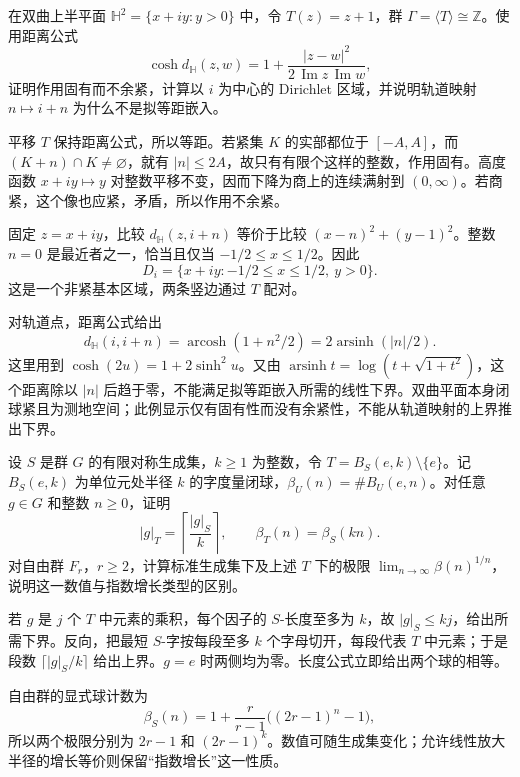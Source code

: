 \begin{exercise}\label{g3:ex:D-parabolic-orbit}
	在双曲上半平面 \(\mathbb H^2=\{x+iy:y>0\}\) 中，令 \(T(z)=z+1\)，群 \(\Gamma=\langle T\rangle\cong\mathbb Z\)。使用距离公式
	\[
		\cosh d_{\mathbb H}(z,w)
		=1+\frac{|z-w|^2}{2\,\operatorname{Im}z\,\operatorname{Im}w},
	\]
	证明作用固有而不余紧，计算以 \(i\) 为中心的 Dirichlet 区域，并说明轨道映射 \(n\mapsto i+n\) 为什么不是拟等距嵌入。
\end{exercise}
\begin{solution}
	平移 \(T\) 保持距离公式，所以等距。若紧集 \(K\) 的实部都位于 \([-A,A]\)，而 \((K+n)\cap K\ne\varnothing\)，就有 \(|n|\le2A\)，故只有有限个这样的整数，作用固有。高度函数 \(x+iy\mapsto y\) 对整数平移不变，因而下降为商上的连续满射到 \((0,\infty)\)。若商紧，这个像也应紧，矛盾，所以作用不余紧。

	固定 \(z=x+iy\)，比较 \(d_{\mathbb H}(z,i+n)\) 等价于比较
	\((x-n)^2+(y-1)^2\)。整数 \(n=0\) 是最近者之一，恰当且仅当 \(-1/2\le x\le1/2\)。因此
	\[
		D_i=\{x+iy:-1/2\le x\le1/2,\ y>0\}.
	\]
	这是一个非紧基本区域，两条竖边通过 \(T\) 配对。

	对轨道点，距离公式给出
	\[
		d_{\mathbb H}(i,i+n)
		=\operatorname{arcosh}(1+n^2/2)
		=2\operatorname{arsinh}(|n|/2).
	\]
	这里用到 \(\cosh(2u)=1+2\sinh^2u\)。又由
	\(\operatorname{arsinh}t=\log(t+\sqrt{1+t^2})\)，这个距离除以 \(|n|\) 后趋于零，不能满足拟等距嵌入所需的线性下界。双曲平面本身闭球紧且为测地空间；此例显示仅有固有性而没有余紧性，不能从轨道映射的上界推出下界。
\end{solution}

\begin{exercise}\label{g3:ex:D-enlarged-generators-growth}
	设 \(S\) 是群 \(G\) 的有限对称生成集，\(k\ge1\) 为整数，令 \(T=B_S(e,k)\setminus\{e\}\)。记 \(B_S(e,k)\) 为单位元处半径 \(k\) 的字度量闭球，\(\beta_U(n)=\#B_U(e,n)\)。对任意 \(g\in G\) 和整数 \(n\ge0\)，证明
	\[
		|g|_T=\left\lceil\frac{|g|_S}{k}\right\rceil,
		\qquad \beta_T(n)=\beta_S(kn).
	\]
	对自由群 \(F_r\)，\(r\ge2\)，计算标准生成集下及上述 \(T\) 下的极限 \(\lim_{n\to\infty}\beta(n)^{1/n}\)，说明这一数值与指数增长类型的区别。
\end{exercise}
\begin{solution}
	若 \(g\) 是 \(j\) 个 \(T\) 中元素的乘积，每个因子的 \(S\)-长度至多为 \(k\)，故 \(|g|_S\le kj\)，给出所需下界。反向，把最短 \(S\)-字按每段至多 \(k\) 个字母切开，每段代表 \(T\) 中元素；于是段数 \(\lceil|g|_S/k\rceil\) 给出上界。\(g=e\) 时两侧均为零。长度公式立即给出两个球的相等。

	自由群的显式球计数为
	\[
		\beta_S(n)=1+\frac{r}{r-1}\bigl((2r-1)^n-1\bigr),
	\]
	所以两个极限分别为 \(2r-1\) 和 \((2r-1)^k\)。数值可随生成集变化；允许线性放大半径的增长等价则保留“指数增长”这一性质。
\end{solution}

